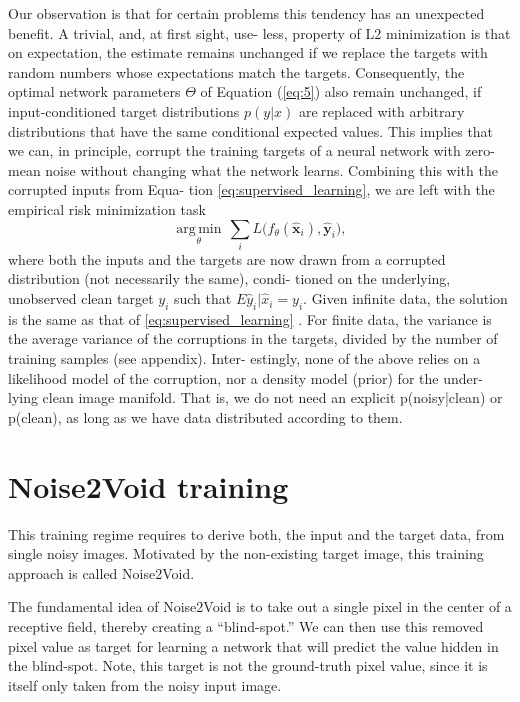 Our observation is that for certain problems this tendency
has an unexpected benefit. A trivial, and, at first sight, use-
less, property of L2 minimization is that on expectation, the
estimate remains unchanged if we replace the targets with
random numbers whose expectations match the targets. Consequently, the
optimal network parameters $\Theta$ of Equation (\ref{eq:5}) also remain
unchanged, if input-conditioned target distributions $p(y|x)$
are replaced with arbitrary distributions that have the same
conditional expected values. This implies that we can, in
principle, corrupt the training targets of a neural network
with zero-mean noise without changing what the network
learns. Combining this with the corrupted inputs from Equa-
tion \ref{eq:supervised_learning}, we are left with the empirical risk minimization task
\begin{equation}
  \underset{\theta}{\operatorname{arg\,min}} \, \sum_i L \big(f_\theta(\hat{\mathbf x}_i), \hat{\mathbf y}_i\big),
\end{equation}
where both the inputs and the targets are now drawn from a corrupted
distribution (not necessarily the same), condi- tioned on the
underlying, unobserved clean target $y_i$ such that
$E{\hat{y}_i|\hat{x}_i} = y_i$. Given infinite data, the solution is
the same as that of \ref{eq:supervised_learning} . For finite data,
the variance is the average variance of the corruptions in the
targets, divided by the number of training samples (see
appendix). Inter- estingly, none of the above relies on a likelihood
model of the corruption, nor a density model (prior) for the under-
lying clean image manifold. That is, we do not need an explicit
p(noisy|clean) or p(clean), as long as we have data distributed
according to them.

\section{Noise2Void training}

This training regime requires to derive both, the input and the target
data, from single noisy images. Motivated by the non-existing target
image, this training approach is called Noise2Void. %


The fundamental idea of Noise2Void is to take out a single pixel in
the center of a receptive field, thereby creating a “blind-spot.” We
can then use this removed pixel value as target for learning a network
that will predict the value hidden in the blind-spot. Note, this
target is not the ground-truth pixel value, since it is itself only
taken from the noisy input image. %

